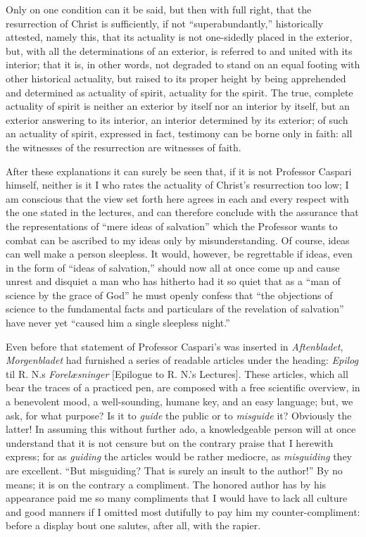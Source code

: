\documentclass[12pt]{book}
\newcommand{\opage}[1]{\marginnote{\footnotesize\textit{[#1]}}}
\begin{document}
Only on one condition can it be said, but then with full right, that the
resurrection of Christ is sufficiently, if not ``superabundantly,''
historically attested, namely this, that its actuality is not one-sidedly
placed in the exterior, but, with all the determinations of an exterior,
is referred to and united with its interior; that it is, in other words,
not degraded to stand on an equal
\opage{310}\setcounter{footnote}{0}%
footing with other historical actuality, but raised to its proper height
by being apprehended and determined as actuality of spirit, actuality for
the spirit. The true, complete actuality of spirit is neither an exterior
by itself nor an interior by itself, but an exterior answering to its
interior, an interior determined by its exterior; of such an actuality of
spirit, expressed in fact, testimony can be borne only in faith: all the
witnesses of the resurrection are witnesses of faith.

After these explanations it can surely be seen that, if it is not
Professor Caspari himself, neither is it I who rates the actuality of
Christ's resurrection too low; I am conscious that the view set forth
here agrees in each and every respect with the one stated in the
lectures, and can therefore conclude with the assurance that the
representations of ``mere ideas of salvation'' which the Professor wants to
combat can be ascribed to my ideas only by misunderstanding. Of course,
ideas can well make a person sleepless. It would, however, be
regrettable if ideas, even in the form of ``ideas of salvation,'' should
now all at once come up and cause unrest and disquiet a man who has
hitherto had it so quiet that as a ``man of science by the grace of God''
he must openly confess that ``the objections of science to the
fundamental facts and particulars of the revelation of salvation'' have
never yet ``caused him a single sleepless night.''

Even before that statement of Professor Caspari's was inserted in
\emph{Aftenbladet}, \emph{Morgenbladet} had furnished a series of readable
articles under the heading: \emph{Epilog} til R. N.s \emph{Forelæsninger}
[Epilogue to R. N.'s Lectures]. These articles, which all bear the traces
of a practiced pen, are composed with a free scientific overview, in a
benevolent mood, a well-sounding, humane key, and an easy language; but,
we ask, for what purpose? Is it to \emph{guide} the public or to
\emph{misguide} it? Obviously the latter! In assuming this without further
ado, a knowledgeable person will at once understand that it is not
censure but
\opage{311}\setcounter{footnote}{0}%
on the contrary praise that I herewith express; for as \emph{guiding}
the articles would be rather mediocre, as \emph{misguiding} they are
excellent. ``But misguiding? That is surely an insult to the author!'' By
no means; it is on the contrary a compliment. The honored author has by
his appearance paid me so many compliments that I would have to lack all
culture and good manners if I omitted most dutifully to pay him my
counter-compliment: before a display bout one salutes, after all, with
the rapier.
\end{document}
